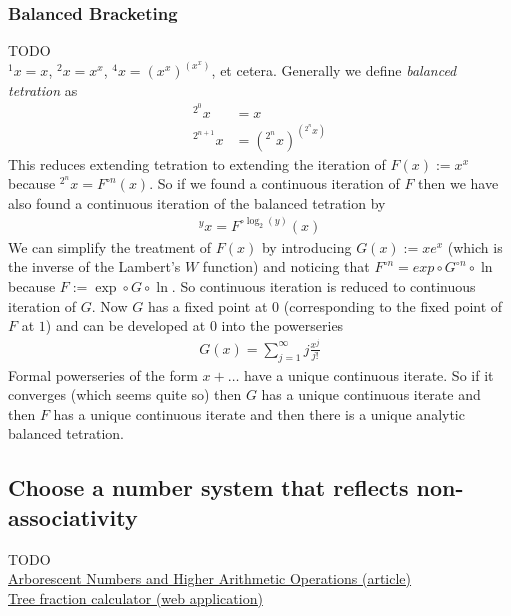 \documentclass[12pt]{article}
\theoremstyle{definition}
\newcommand{\tet}[2]{{{}^{#2}{#1}}}
\begin{document}
\subsubsection{Balanced Bracketing}
TODO\\
$\tet{x}{1}=x$, $\tet{x}{2}=x^x$,
$\tet{x}{4}=\left(x^x\right)^{\left(x^x\right)}$,
et cetera. Generally we define {\em balanced tetration} as
\begin{align*}
  \tet{x}{2^0}&=x\\
  \tet{x}{2^{n+1}} &=
  \left(\tet{x}{2^n}\right)^{\left(\tet{x}{2^n}\right)}
\end{align*}
This reduces extending tetration to extending the iteration of
$F(x):=x^x$ because $\tet{x}{2^n}=F^{\circ n}(x)$. So if we found a
continuous iteration of $F$ then we have also found a continuous
iteration of the balanced tetration by
\begin{align*}
  \tet{x}{y}=F^{\circ \log_2(y)}(x)
\end{align*}
We can simplify the treatment of $F(x)$ by introducing $G(x):=xe^x$
(which is the inverse of the Lambert's $W$ function) and noticing that
$F^{\circ n}=exp\circ G^{\circ n} \circ \ln$ because $F:=\exp\circ
G\circ \ln$. So continuous iteration is reduced to continuous
iteration of $G$. Now $G$ has a fixed point at $0$ (corresponding to
the fixed point of $F$ at $1$) and can be developed at $0$ into the
powerseries
\begin{align*}
  G(x)=\sum_{j=1}^\infty j \frac{x^{j}}{j!}
\end{align*}
Formal powerseries of the form $x+\dotsc$ have a unique continuous
iterate. So if it converges (which seems quite so) then $G$ has a unique
continuous iterate and then $F$ has a unique continuous iterate and
then there is a unique analytic balanced tetration.

\subsection{Choose a number system that reflects non-associativity}
TODO\\
\href{http://math.eretrandre.org/tree-aoc/pdf/latest.pdf}{Arborescent
  Numbers and Higher Arithmetic Operations (article)}\\
\href{http://math.eretrandre.org/cgi-bin/ftc/ftc.pl}{Tree fraction
  calculator (web application)}



















\nocite{Wolfram:NKSOpenProblems-2003-June}



\end{document}
